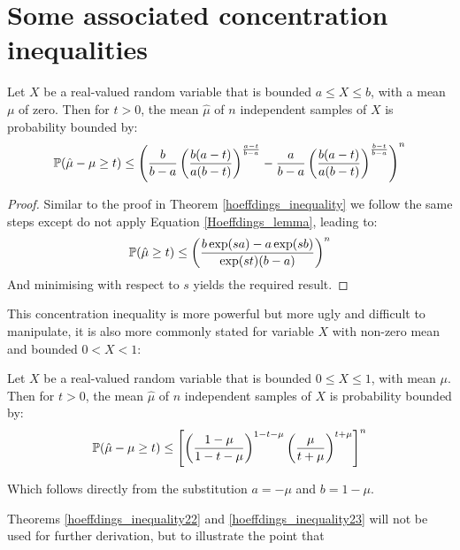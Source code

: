 


\section{Some associated concentration inequalities}\label{Appendix:more_concentration}

\begin{theorem}\label{hoeffdings_inequality22}
Let $X$ be a real-valued random variable that is bounded $a\le X\le b$, with a mean $\mu$ of zero.  Then for $t>0$, the mean $\hat{\mu}$ of $n$ independent samples of $X$ is probability bounded by:
\begin{equation}\operatorname{\mathbb{P}}(\hat{\mu}-\mu\ge t)\le \left( \frac{b}{b-a}\left(\frac{b(a-t)}{a(b-t)}\right)^{\frac{a-t}{b-a}} -\frac{a}{b-a}\left(\frac{b(a-t)}{a(b-t)}\right)^{\frac{b-t}{b-a}}  \right)^n
\end{equation}
\end{theorem}
\begin{proof}
Similar to the proof in Theorem \ref{hoeffdings_inequality} we follow the same steps except do not apply Equation \ref{Hoeffdings_lemma}, leading to:
$$ \operatorname{\mathbb{P}}(\hat{\mu}\ge t) \le \left(\frac{b\exp(sa) - a\exp(sb)}{\exp(st)(b-a)}\right)^n $$
And minimising with respect to $s$ 
yields the required result.
\end{proof}
This concentration inequality is more powerful but more ugly and difficult to manipulate, it is also more commonly stated for variable $X$ with non-zero mean and bounded $0<X<1$:

\begin{theorem}\label{hoeffdings_inequality23}
Let $X$ be a real-valued random variable that is bounded $0\le X\le 1$, with mean $\mu$. Then for $t>0$, the mean $\hat{\mu}$ of $n$ independent samples of $X$ is probability bounded by:
\begin{equation}\operatorname{\mathbb{P}}(\hat{\mu}-\mu\ge t)\le \left[\left(\frac{1-\mu}{1-t-\mu}\right)^{1-t-\mu}  \left(\frac{\mu}{t+\mu}\right)^{t+\mu}\right]^n
\end{equation}
\end{theorem}
Which follows directly from the substitution $a=-\mu$ and $b=1-\mu$.

Theorems \ref{hoeffdings_inequality22} and \ref{hoeffdings_inequality23} will not be used for further derivation, but to illustrate the point that 



